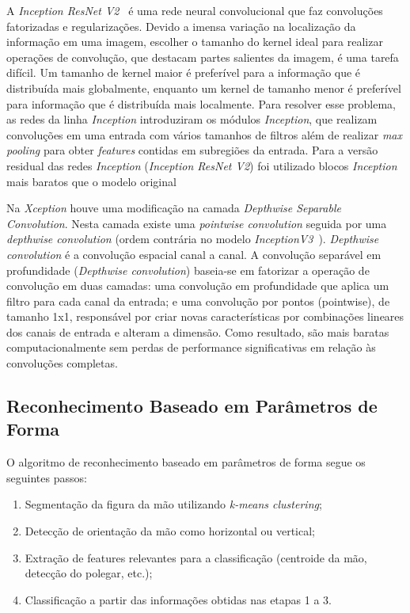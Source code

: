 \documentclass[conference]{IEEEtran}
\begin{document}
A \textit{Inception ResNet V2}~\cite{szegedy2017inception} é uma rede neural convolucional que faz convoluções fatorizadas e regularizações. Devido a imensa variação na localização da informação em uma imagem, escolher o tamanho do kernel ideal para realizar operações de convolução, que destacam partes salientes da imagem, é uma tarefa difícil. Um tamanho de kernel maior é preferível para a informação que é distribuída mais globalmente, enquanto um kernel de tamanho menor é preferível para informação que é distribuída mais localmente. Para resolver esse problema, as redes da linha \textit{Inception} introduziram os módulos \textit{Inception}, que realizam convoluções em uma entrada com vários tamanhos de filtros além de realizar \textit{max pooling} para obter \textit{features} contidas em subregiões da entrada. Para a versão residual das redes \textit{Inception} (\textit{Inception ResNet V2}) foi utilizado blocos \textit{Inception} mais baratos que o modelo original

Na \textit{Xception} houve uma modificação na camada \textit{Depthwise Separable Convolution}. Nesta camada existe uma \textit{pointwise convolution} seguida por uma \textit{depthwise convolution} (ordem contrária no modelo \textit{InceptionV3}~\cite{inception}). \textit{Depthwise convolution} é a convolução espacial canal a canal. A convolução separável em profundidade (\textit{Depthwise convolution}) baseia-se em fatorizar a operação de convolução em duas camadas: uma convolução em profundidade que aplica um filtro para cada canal da entrada; e uma convolução por pontos (pointwise), de tamanho 1x1, responsável por criar novas características por combinações lineares dos canais de entrada e alteram a dimensão. Como resultado, são mais baratas computacionalmente sem perdas de performance significativas em relação às convoluções completas.
\subsection{Reconhecimento Baseado em Parâmetros de Forma} 
O algoritmo de reconhecimento baseado em parâmetros de forma segue os seguintes passos:
\begin{enumerate}
\item Segmentação da figura da mão utilizando \textit{k-means clustering};
\item Detecção de orientação da mão como horizontal ou vertical;
\item Extração de features relevantes para a classificação (centroide da mão, detecção do polegar, etc.);
\item Classificação a partir das informações obtidas nas etapas 1 a 3.
\end{enumerate}
\end{document}
